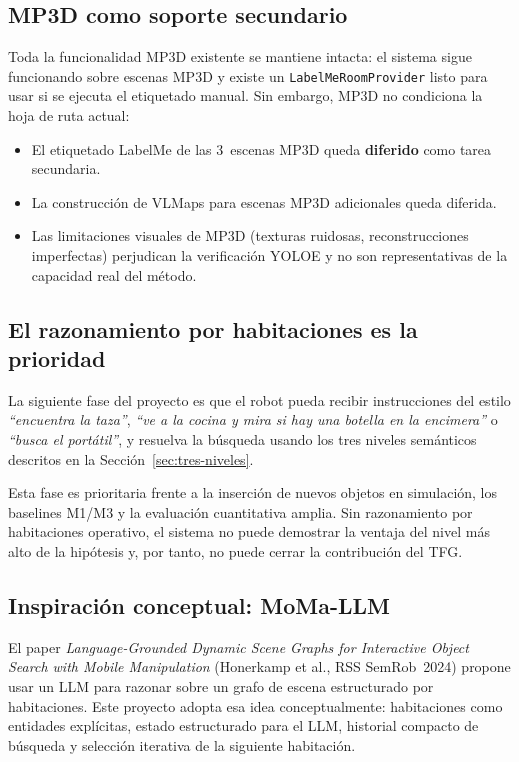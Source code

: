 \documentclass[11pt,a4paper]{article}
\begin{document}
\subsection{MP3D como soporte secundario}

Toda la funcionalidad MP3D existente se mantiene intacta: el sistema sigue
funcionando sobre escenas MP3D y existe un \texttt{LabelMeRoomProvider} listo
para usar si se ejecuta el etiquetado manual. Sin embargo, MP3D no condiciona
la hoja de ruta actual:

\begin{itemize}
  \item El etiquetado LabelMe de las 3~escenas MP3D queda \textbf{diferido}
        como tarea secundaria.
  \item La construcción de VLMaps para escenas MP3D adicionales queda diferida.
  \item Las limitaciones visuales de MP3D (texturas ruidosas, reconstrucciones
        imperfectas) perjudican la verificación YOLOE y no son representativas
        de la capacidad real del método.
\end{itemize}

\subsection{El razonamiento por habitaciones es la prioridad}

La siguiente fase del proyecto es que el robot pueda recibir instrucciones del
estilo \textit{``encuentra la taza''}, \textit{``ve a la cocina y mira si hay
una botella en la encimera''} o \textit{``busca el portátil''}, y resuelva la
búsqueda usando los tres niveles semánticos descritos en la
Sección~\ref{sec:tres-niveles}.

Esta fase es prioritaria frente a la inserción de nuevos objetos en
simulación, los baselines M1/M3 y la evaluación cuantitativa amplia. Sin
razonamiento por habitaciones operativo, el sistema no puede demostrar la
ventaja del nivel más alto de la hipótesis y, por tanto, no puede cerrar la
contribución del TFG.

\subsection{Inspiración conceptual: MoMa-LLM}

El paper \textit{Language-Grounded Dynamic Scene Graphs for Interactive Object
Search with Mobile Manipulation} (Honerkamp et al., RSS SemRob~2024) propone
usar un LLM para razonar sobre un grafo de escena estructurado por
habitaciones. Este proyecto adopta esa idea conceptualmente: habitaciones como
entidades explícitas, estado estructurado para el LLM, historial compacto de
búsqueda y selección iterativa de la siguiente habitación.
\end{document}
